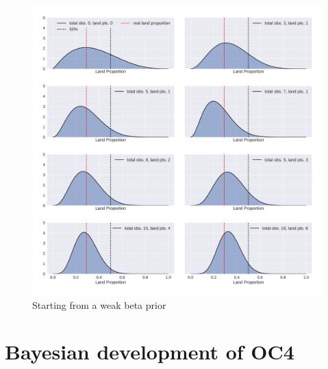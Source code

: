 \documentclass[10pt]{article}
\begin{document}
			\begin{figure}[H]
				\centering
				\includegraphics[scale=0.35]{landProp_weak.png}
				\caption{Starting from a weak beta prior}
			\end{figure}%
\section{Bayesian development of OC4}
\end{document}
